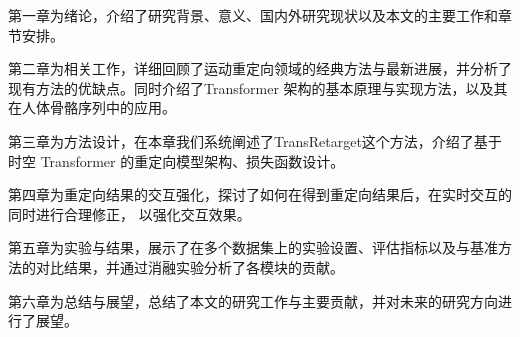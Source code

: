 第一章为绪论，介绍了研究背景、意义、国内外研究现状以及本文的主要工作和章节安排。

第二章为相关工作，详细回顾了运动重定向领域的经典方法与最新进展，并分析了现有方法的优缺点。同时介绍了Transformer
架构的基本原理与实现方法，以及其在人体骨骼序列中的应用。

第三章为方法设计，在本章我们系统阐述了TransRetarget这个方法，介绍了基于时空 Transformer 的重定向模型架构、损失函数设计。

第四章为重定向结果的交互强化，探讨了如何在得到重定向结果后，在实时交互的同时进行合理修正，
以强化交互效果。

第五章为实验与结果，展示了在多个数据集上的实验设置、评估指标以及与基准方法的对比结果，并通过消融实验分析了各模块的贡献。



第六章为总结与展望，总结了本文的研究工作与主要贡献，并对未来的研究方向进行了展望。

